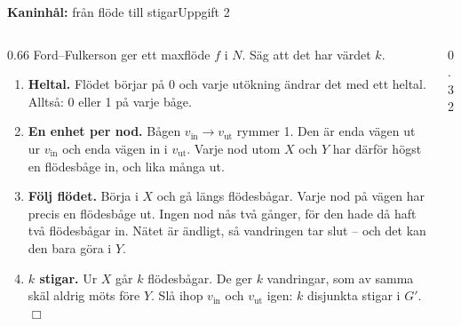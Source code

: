 \documentclass[aspectratio=169,10pt]{beamer}
\newcommand{\rabbit}{\textcolor{warnorange}{\textbf{Kaninhål:}} }
\begin{document}
\begin{frame}{\rabbit från flöde till stigar}{Uppgift 2}
  \begin{columns}[T]
    \begin{column}{0.66\textwidth}
      \small
      Ford--Fulkerson ger ett maxflöde $f$ i $N$. Säg att det har värdet $k$.
      \begin{enumerate}
        \item<1-> \textbf{Heltal.} Flödet börjar på 0 och varje utökning ändrar det med ett heltal. Alltså: 0 eller 1 på varje båge.
        \item<2-> \textbf{En enhet per nod.} Bågen $v_{\text{in}}\to v_{\text{ut}}$ rymmer 1. Den är enda vägen ut ur $v_{\text{in}}$ och enda vägen in i $v_{\text{ut}}$. Varje nod utom $X$ och $Y$ har därför högst en flödesbåge in, och lika många ut.
        \item<3-> \textbf{Följ flödet.} Börja i $X$ och gå längs flödesbågar. Varje nod på vägen har precis en flödesbåge ut. Ingen nod nås två gånger, för den hade då haft två flödesbågar in. Nätet är ändligt, så vandringen tar slut -- och det kan den bara göra i $Y$.
        \item<4-> \textbf{$k$ stigar.} Ur $X$ går $k$ flödesbågar. De ger $k$ vandringar, som av samma skäl aldrig möts före $Y$. Slå ihop $v_{\text{in}}$ och $v_{\text{ut}}$ igen: $k$ disjunkta stigar i $G'$. \hfill$\Box$
      \end{enumerate}
    \end{column}
    \begin{column}{0.32\textwidth}
      \centering
    \end{column}
  \end{columns}
\end{frame}
\end{document}
